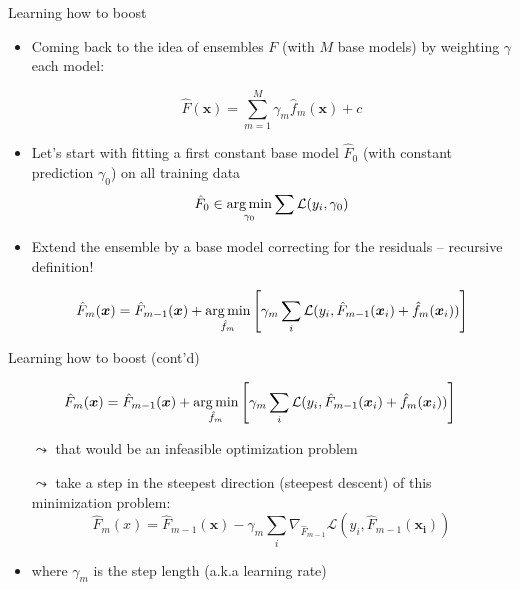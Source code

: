 \documentclass[aspectratio=169]{../latex_main/tntbeamer}  %
\begin{document}
	\begin{frame}[c]{Learning how to boost}

    \vspace{-1em}
    \begin{itemize}
        \item Coming back to the idea of ensembles $F$ (with $M$ base models) by weighting $\gamma$ each model:
        
        $$ \hat{F}(\bm{x}) = \sum_{m=1}^{M} \gamma_m \hat{f}_m(\bm{x}) + c $$
        \item Let's start with fitting a first constant base model $\hat{F}_0$ (with constant prediction $\gamma_0$) on all training data
        $$\hat{F}_0 \in \operatorname*{arg\,min}_{\gamma_0} \sum \mathcal{L}(y_i, \gamma_0) $$
        \item Extend the ensemble by a base model correcting for the residuals -- recursive definition!
        
        $$ \hat{F}_m (\bm{x}) = \hat{F}_{m-1}(\bm{x}) + \operatorname*{arg\,min}_{\hat{f}_m} \left[ \gamma_m \sum_i \mathcal{L}(y_i, \hat{F}_{m-1}(\bm{x}_i) + \hat{f}_m(\bm{x}_i)) \right] $$
    \end{itemize}

	\end{frame}
	
	\begin{frame}[c]{Learning how to boost (cont'd)}

    \vspace{-1em}
    $$ \hat{F}_m (\bm{x}) = \hat{F}_{m-1}(\bm{x}) + \operatorname*{arg\,min}_{\hat{f}_m} \left[ \gamma_m \sum_i \mathcal{L}(y_i, \hat{F}_{m-1}(\bm{x}_i) + \hat{f}_m(\bm{x}_i)) \right] $$
    \begin{itemize}
        \item[$\leadsto$] that would be an infeasible optimization problem
        \item[$\leadsto$] take a step in the steepest direction (steepest descent) of this minimization problem:
        $$ \hat{F}_m(x) = \hat{F}_{m-1}(\bm{x}) - \gamma_m \sum_i \nabla_{\hat{F}_{m-1}} \mathcal{L}(y_i, \hat{F}_{m-1}(\bm{x_i})) $$
        \item where $\gamma_m$ is the step length (a.k.a learning rate)
    \end{itemize}

	\end{frame}
	
\end{document}

